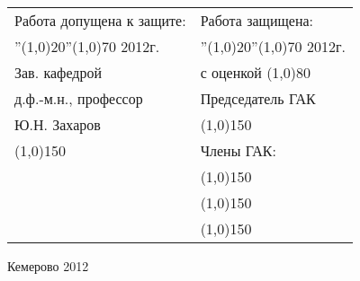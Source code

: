 \begin{titlepage}
    \begin{center}
	\begin{tabular}{ll}
	    Работа допущена к защите: & Работа защищена: \\
	    ''\line(1,0){20}''\hspace{0.5em}\line(1,0){70} \hspace{0.2em} 2012г. & ''\line(1,0){20}''\hspace{0.5em}\line(1,0){70} \hspace{0.2em} 2012г. \\
	    Зав. кафедрой & с оценкой \line(1,0){80}  \\
	    д.ф.-м.н., профессор & Председатель ГАК \\
	    Ю.Н. Захаров & \line(1,0){150}\\
	    \line(1,0){150} & Члены ГАК: \\
	    & \line(1,0){150} \\
	    & \line(1,0){150} \\
	    & \line(1,0){150} \\
	\end{tabular}
    \end{center}
    \vspace{\fill}

    \begin{center}
	Кемерово 2012
    \end{center}

\end{titlepage}
